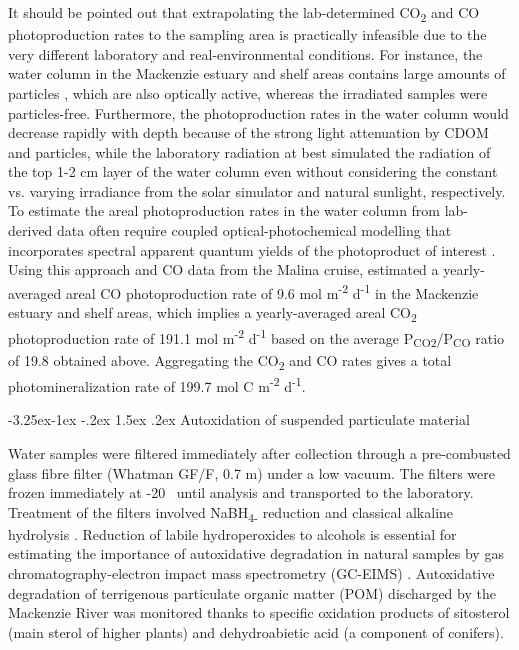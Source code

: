 \documentclass[essd, manuscript]{copernicus}
\makeatletter
\renewcommand\paragraph{\@startsection{paragraph}{4}{\z@}%
                                     {-3.25ex\@plus -1ex \@minus -.2ex}%
                                     {1.5ex \@plus .2ex}%
                                     {\normalfont\normalsize\bfseries}}
\makeatother
\begin{document}
It should be pointed out that extrapolating the lab-determined CO\textsubscript{2} and CO photoproduction rates to the sampling area is practically infeasible due to the very different laboratory and real-environmental conditions. For instance, the water column in the Mackenzie estuary and shelf areas contains large amounts of particles \citep{Doxaran2012}, which are also optically active, whereas the irradiated samples were particles-free. Furthermore, the photoproduction rates in the water column would decrease rapidly with depth because of the strong light attenuation by CDOM and particles, while the laboratory radiation at best simulated the radiation of the top 1-2 cm layer of the water column even without considering the constant vs. varying irradiance from the solar simulator and natural sunlight, respectively. To estimate the areal photoproduction rates in the water column from lab-derived data often require coupled optical-photochemical modelling that incorporates spectral apparent quantum yields of the photoproduct of interest \citep{Belanger2006, Xie2009, Fichot2010}. Using this approach and CO data from the Malina cruise, \citet{Song2013} estimated a yearly-averaged areal CO photoproduction rate of 9.6 \textmu mol m\textsuperscript{-2} d\textsuperscript{-1} in the Mackenzie estuary and shelf areas, which implies a yearly-averaged areal CO\textsubscript{2} photoproduction rate of 191.1 \textmu mol m\textsuperscript{-2} d\textsuperscript{-1} based on the average P\textsubscript{CO2}/P\textsubscript{CO} ratio of 19.8 obtained above. Aggregating the CO\textsubscript{2} and CO rates gives a total photomineralization rate of 199.7 \textmu mol C m\textsuperscript{-2} d\textsuperscript{-1}. 

\paragraph{Autoxidation of suspended particulate material}

Water samples were filtered immediately after collection through a pre-combusted glass fibre filter (Whatman GF/F, 0.7 \textmu m) under a low vacuum. The filters were frozen immediately at -20 \textcelsius~until analysis and transported to the laboratory. Treatment of the filters involved NaBH\textsubscript{4-} reduction and classical alkaline hydrolysis \citep{Rontani2012}. Reduction of labile hydroperoxides to alcohols is essential for estimating the importance of autoxidative degradation in natural samples by gas chromatography-electron impact mass spectrometry (GC-EIMS) \citep{Marchand2001}. Autoxidative degradation of terrigenous particulate organic matter (POM) discharged by the Mackenzie River was monitored thanks to specific oxidation products of sitosterol (main sterol of higher plants) and dehydroabietic acid (a component of conifers). 
\end{document}
